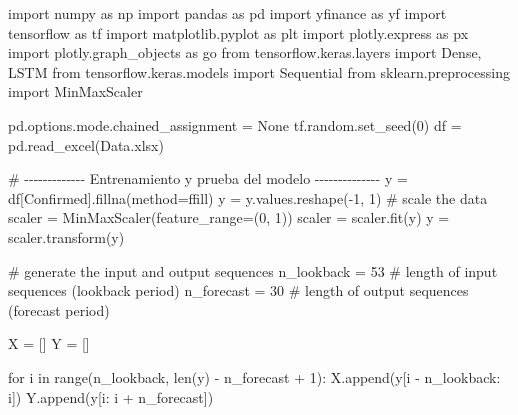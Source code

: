 \documentclass[
  us-letterpaper,
]{scrreprt}
\newenvironment{Shaded}{\begin{snugshade}}{\end{snugshade}}
\newcommand{\BuiltInTok}[1]{\textcolor[rgb]{0.00,0.23,0.31}{#1}}
\newcommand{\CommentTok}[1]{\textcolor[rgb]{0.37,0.37,0.37}{#1}}
\newcommand{\ControlFlowTok}[1]{\textcolor[rgb]{0.00,0.23,0.31}{#1}}
\newcommand{\DecValTok}[1]{\textcolor[rgb]{0.68,0.00,0.00}{#1}}
\newcommand{\ImportTok}[1]{\textcolor[rgb]{0.00,0.46,0.62}{#1}}
\newcommand{\KeywordTok}[1]{\textcolor[rgb]{0.00,0.23,0.31}{#1}}
\newcommand{\NormalTok}[1]{\textcolor[rgb]{0.00,0.23,0.31}{#1}}
\newcommand{\OperatorTok}[1]{\textcolor[rgb]{0.37,0.37,0.37}{#1}}
\newcommand{\StringTok}[1]{\textcolor[rgb]{0.13,0.47,0.30}{#1}}
\newcommand{\VariableTok}[1]{\textcolor[rgb]{0.07,0.07,0.07}{#1}}
\theoremstyle{plain}
\theoremstyle{definition}
\theoremstyle{plain}
\theoremstyle{definition}
\theoremstyle{remark}
\begin{document}
\begin{Shaded}
\begin{Highlighting}[]
\ImportTok{import}\NormalTok{ numpy }\ImportTok{as}\NormalTok{ np}
\ImportTok{import}\NormalTok{ pandas }\ImportTok{as}\NormalTok{ pd}
\ImportTok{import}\NormalTok{ yfinance }\ImportTok{as}\NormalTok{ yf}
\ImportTok{import}\NormalTok{ tensorflow }\ImportTok{as}\NormalTok{ tf}
\ImportTok{import}\NormalTok{ matplotlib.pyplot }\ImportTok{as}\NormalTok{ plt}
\ImportTok{import}\NormalTok{ plotly.express }\ImportTok{as}\NormalTok{ px}
\ImportTok{import}\NormalTok{ plotly.graph\_objects }\ImportTok{as}\NormalTok{ go}
\ImportTok{from}\NormalTok{ tensorflow.keras.layers }\ImportTok{import}\NormalTok{ Dense, LSTM}
\ImportTok{from}\NormalTok{ tensorflow.keras.models }\ImportTok{import}\NormalTok{ Sequential}
\ImportTok{from}\NormalTok{ sklearn.preprocessing }\ImportTok{import}\NormalTok{ MinMaxScaler}

\NormalTok{pd.options.mode.chained\_assignment }\OperatorTok{=} \VariableTok{None}
\NormalTok{tf.random.set\_seed(}\DecValTok{0}\NormalTok{)}
\NormalTok{df }\OperatorTok{=}\NormalTok{ pd.read\_excel(}\StringTok{\textquotesingle{}Data.xlsx\textquotesingle{}}\NormalTok{)}

\CommentTok{\# {-}{-}{-}{-}{-}{-}{-}{-}{-}{-}{-}{-}{-} Entrenamiento y prueba del modelo {-}{-}{-}{-}{-}{-}{-}{-}{-}{-}{-}{-}{-}{-}}
\NormalTok{y }\OperatorTok{=}\NormalTok{ df[}\StringTok{\textquotesingle{}Confirmed\textquotesingle{}}\NormalTok{].fillna(method}\OperatorTok{=}\StringTok{\textquotesingle{}ffill\textquotesingle{}}\NormalTok{)}
\NormalTok{y }\OperatorTok{=}\NormalTok{ y.values.reshape(}\OperatorTok{{-}}\DecValTok{1}\NormalTok{, }\DecValTok{1}\NormalTok{)}
\CommentTok{\# scale the data}
\NormalTok{scaler }\OperatorTok{=}\NormalTok{ MinMaxScaler(feature\_range}\OperatorTok{=}\NormalTok{(}\DecValTok{0}\NormalTok{, }\DecValTok{1}\NormalTok{))}
\NormalTok{scaler }\OperatorTok{=}\NormalTok{ scaler.fit(y)}
\NormalTok{y }\OperatorTok{=}\NormalTok{ scaler.transform(y)}

\CommentTok{\# generate the input and output sequences}
\NormalTok{n\_lookback }\OperatorTok{=} \DecValTok{53}  \CommentTok{\# length of input sequences (lookback period)}
\NormalTok{n\_forecast }\OperatorTok{=} \DecValTok{30}  \CommentTok{\# length of output sequences (forecast period)}

\NormalTok{X }\OperatorTok{=}\NormalTok{ []}
\NormalTok{Y }\OperatorTok{=}\NormalTok{ []}

\ControlFlowTok{for}\NormalTok{ i }\KeywordTok{in} \BuiltInTok{range}\NormalTok{(n\_lookback, }\BuiltInTok{len}\NormalTok{(y) }\OperatorTok{{-}}\NormalTok{ n\_forecast }\OperatorTok{+} \DecValTok{1}\NormalTok{):}
\NormalTok{    X.append(y[i }\OperatorTok{{-}}\NormalTok{ n\_lookback: i])}
\NormalTok{    Y.append(y[i: i }\OperatorTok{+}\NormalTok{ n\_forecast])}


\end{Highlighting}
\end{Shaded}
\end{document}
